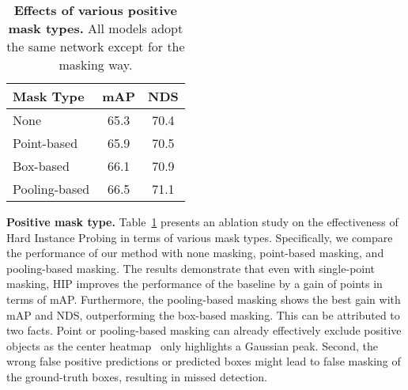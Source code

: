 \documentclass[10pt,twocolumn,letterpaper]{article}
\begin{document}
\begin{table}[bpt]
	\begin{center}
		\begin{tabular}{lcc}
			\toprule
			  Mask Type & mAP & NDS \\ \midrule
                None  & 65.3 & 70.4 \\ \midrule
Point-based & 65.9 & 70.5 \\
                Box-based & 66.1 & 70.9 \\ 
                Pooling-based & 66.5 & 71.1 \\
			\bottomrule
		\end{tabular}
	\end{center}
	\caption{\textbf{Effects of various positive mask types.} All models adopt the same network except for the masking way.} \label{tab: whether apply mask}
\end{table}

\vspace{2mm}
\noindent\textbf{Positive mask type.}
Table~\ref{tab: whether apply mask} presents an ablation study on the effectiveness of Hard Instance Probing in terms of various mask types. Specifically, we compare the performance of our method with none masking, point-based masking, and pooling-based masking. The results demonstrate that even with single-point masking, HIP improves the performance of the baseline by a gain of  points in terms of mAP. Furthermore, the pooling-based masking shows the best gain with  mAP and  NDS, outperforming the box-based masking. This can be attributed to two facts. Point or pooling-based masking can already effectively exclude positive objects as the center heatmap~\cite{centerpoint} only highlights a Gaussian peak. Second, the wrong false positive predictions or predicted boxes might lead to false masking of the ground-truth boxes, resulting in missed detection.
\end{document}
